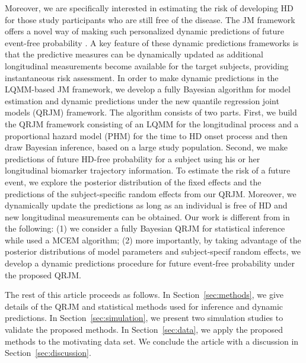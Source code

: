 Moreover, we are specifically interested in estimating the risk of developing HD for those study participants who are still free of the disease. The JM framework offers a novel way of making such personalized dynamic predictions of future event-free probability \citep{rizopoulos2011dynamic,taylor2013real}. A key feature of these dynamic predictions frameworks is that the predictive measures can be dynamically updated as additional longitudinal measurements become available for the target subjects, providing instantaneous risk assessment. In order to make dynamic predictions in the LQMM-based JM framework, we develop a fully Bayesian algorithm for model estimation and dynamic predictions under the new quantile regression joint models (QRJM) framework. The algorithm consists of two parts. First, we build the QRJM framework consisting of an LQMM for the longitudinal process and a proportional hazard model (PHM) for the time to HD onset process and then draw Bayesian inference, based on a large study population. Second, we make predictions of future HD-free probability for a subject using his or her longitudinal biomarker trajectory information. To estimate the risk of a future event, we explore the posterior distribution of the fixed effects and the predictions of the subject-specific random effects from our QRJM. Moreover, we dynamically update the predictions as long as an individual is free of HD and new longitudinal measurements can be obtained. {Our work is different from \cite{farcomeni2015longitudinal} in the following: (1) we consider a fully Bayesian QRJM for statistical inference while \cite{farcomeni2015longitudinal} used a MCEM algorithm; (2) more importantly, by taking advantage of the posterior distributions of model parameters and subject-specif random effects, we develop a dynamic predictions procedure for future event-free probability under the proposed QRJM.}

The rest of this article proceeds as follows. In Section~\ref{sec:methods}, we give details of the QRJM and statistical methods used for inference and dynamic predictions. In Section~\ref{sec:simulation}, we present two simulation studies to validate the proposed methods. In Section~\ref{sec:data}, we apply the proposed methods to the motivating data set. We conclude the article with a discussion in Section~\ref{sec:discussion}.

% 
% 

